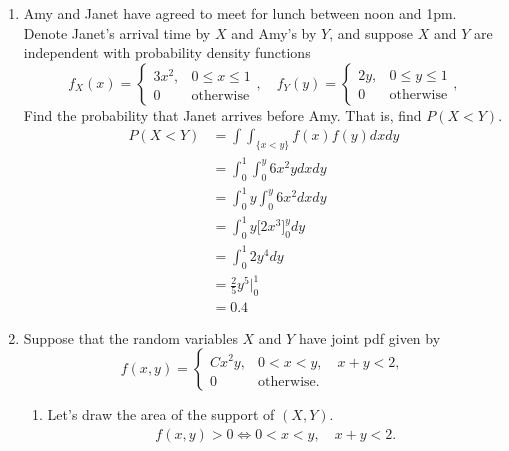\documentclass[12pt]{article} %
\newcommand{\Red}{\color{Red}}
\begin{document}
\thispagestyle{firstpage}


\begin{enumerate}

\item Amy and Janet have agreed to meet for lunch between noon and 1pm. Denote Janet's arrival time by $X$ and Amy's by $Y$, and suppose $X$ and $Y$ are independent with probability density functions
	\begin{equation*}
			f_{X}(x)=\begin{cases}
			3x^2,  & 0\leq x\leq 1\\
			0 & \text{otherwise}
			\end{cases}, 
			\quad
				f_{Y}(y)=\begin{cases}
			2y,  & 0\leq y\leq 1\\
			0 & \text{otherwise}
			\end{cases}, 
	\end{equation*}
Find the probability that Janet arrives before Amy. That is, find $P(X<Y)$. \\ {\Red $$\begin{aligned}
    P(X < Y) &= \int \int_{\{x < y\}} f(x) f(y) dxdy \\
    &= \int_0^1 \int_0^y 6x^2y dxdy \\
    &=\int_0^1 y \int_0^y 6x^2 dxdy \\
    &= \int_0^1 y \Big[ 2x^3\Big]_0^y dy \\
    &= \int_0^1 2y^4 dy \\
    &= \frac{2}{5} y^5 \Bigg \vert_{0}^1 \\
    &= 0.4
\end{aligned}$$}
\newpage
\item Suppose that the random variables $X$ and $Y$ have joint pdf given by
	\begin{equation*}
			f(x,y)=\begin{cases}
			Cx^2 y ,&0<x<y,\quad x+y<2,\\
			0 & \text{otherwise}.
			\end{cases}
	\end{equation*}
	\begin{enumerate}[label=2.\arabic*]
		\item[] Let's draw the area of the support of $(X,Y)$.
        {\Red
        \begin{align*}
        f(x,y)>0 \iff 0<x<y,\quad x+y<2.

\end{align*}}
\end{enumerate}
\end{enumerate}
\end{document}
